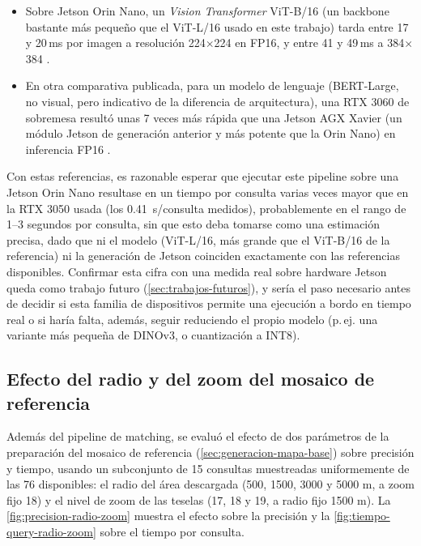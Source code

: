 \begin{itemize}
\item Sobre Jetson Orin Nano, un \textit{Vision Transformer} ViT-B/16 (un backbone bastante más pequeño que el ViT-L/16 usado en este trabajo) tarda entre 17 y 20\,ms por imagen a resolución 224$\times$224 en FP16, y entre 41 y 49\,ms a 384$\times$384 \parencite{jetson_vit_benchmark}.
\item En otra comparativa publicada, para un modelo de lenguaje (BERT-Large, no visual, pero indicativo de la diferencia de arquitectura), una RTX 3060 de sobremesa resultó unas 7 veces más rápida que una Jetson AGX Xavier (un módulo Jetson de generación anterior y más potente que la Orin Nano) en inferencia FP16 \parencite{rtx_jetson_bert_benchmark}.
\end{itemize}

Con estas referencias, es razonable esperar que ejecutar este pipeline sobre una Jetson Orin Nano resultase en un tiempo por consulta varias veces mayor que en la RTX 3050 usada (los \SI{0.41}{\second}/consulta medidos), probablemente en el rango de 1--3 segundos por consulta, sin que esto deba tomarse como una estimación precisa, dado que ni el modelo (ViT-L/16, más grande que el ViT-B/16 de la referencia) ni la generación de Jetson coinciden exactamente con las referencias disponibles. Confirmar esta cifra con una medida real sobre hardware Jetson queda como trabajo futuro (\autoref{sec:trabajos-futuros}), y sería el paso necesario antes de decidir si esta familia de dispositivos permite una ejecución a bordo en tiempo real o si haría falta, además, seguir reduciendo el propio modelo (p.\,ej. una variante más pequeña de DINOv3, o cuantización a INT8).

\subsection{Efecto del radio y del zoom del mosaico de referencia}
\label{sec:efecto-radio-zoom}

Además del pipeline de matching, se evaluó el efecto de dos parámetros de la preparación del mosaico de referencia (\autoref{sec:generacion-mapa-base}) sobre precisión y tiempo, usando un subconjunto de 15 consultas muestreadas uniformemente de las 76 disponibles: el radio del área descargada (500, 1500, 3000 y 5000 m, a zoom fijo 18) y el nivel de zoom de las teselas (17, 18 y 19, a radio fijo 1500 m). La \autoref{fig:precision-radio-zoom} muestra el efecto sobre la precisión y la \autoref{fig:tiempo-query-radio-zoom} sobre el tiempo por consulta.

